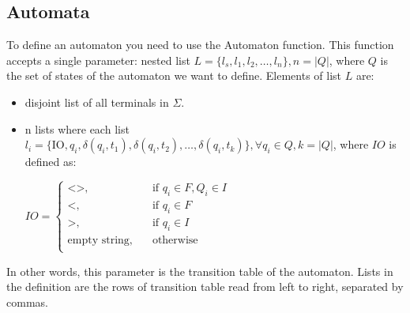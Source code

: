 \documentclass{ctuthesis}
\begin{document}
\subsection{Automata}
\label{subsec:automata-variables}
To define an automaton you need to use the Automaton function. This function accepts a single parameter: nested list $L = \{l_s, l_1, l_2, \ldots, l_n\}, n = |Q|$, where $Q$ is the set of states of the automaton we want to define.  Elements of list $L$ are:
\begin{itemize}
	\item disjoint list of all terminals in $\Sigma$.
	\item n lists where each list $l_i = \{\text{IO}, q_i, \delta(q_i, t_1), \delta(q_i, t_2), \ldots, \delta(q_i, t_k)\}, \forall q_i \in Q, k = |Q|$, where $IO$ is defined as: 
 	
	$IO = 
		\begin{cases}
			\text{<>,} &\quad\text{if }q_i \in F, Q_i \in I \\
			\text{<,} &\quad\text{if }q_i \in F\\
			\text{>,} &\quad\text{if }q_i \in I \\
			\text{empty string,} &\quad\text{otherwise}\\
		\end{cases}$
\end{itemize}

In other words, this parameter is the transition table of the automaton. Lists in the definition are the rows of transition table read from left to right, separated by commas.
\end{document}

